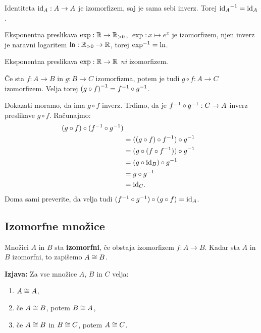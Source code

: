 \begin{primer}
  Identiteta $\id[A] : A \to A$ je izomorfizem, saj je sama sebi inverz.
  Torej $\inv{\id[A]} = \id[A]$.
\end{primer}

\begin{primer}
  Eksponentna preslikava $\exp : \RR \to \RR_{> 0}$, $\exp : x \mapsto e^x$ je
  izomorfizem, njen inverz je naravni logaritem $\ln : \RR_{> 0} \to \RR$, torej $\inv{\exp} = \ln$.
\end{primer}

\begin{primer}
  Eksponentna preslikava $\exp : \RR \to \RR$ \emph{ni} izomorfizem.
\end{primer}

\begin{izjava}
  Če sta $f : A \to B$ in $g : B \to C$ izomorfizma, potem je tudi $g \circ f : A \to C$ izomorfizem. Velja torej $\inv{(g \circ f)} = \inv{f} \circ \inv{g}$.
\end{izjava}

\begin{dokaz}
  Dokazati moramo, da ima $g \circ f$ inverz. Trdimo, da je $\inv{f} \circ \inv{g} : C \to A$ inverz preslikave $g \circ f$. Računajmo:
  \begin{align*}
    (g \circ f) \circ (\inv{f} \circ \inv{g}) \\
     &= ((g \circ f) \circ \inv{f}) \circ \inv{g} \\
     &= (g \circ (f \circ \inv{f})) \circ \inv{g} \\
     &= (g \circ \id[B]) \circ \inv{g} \\
     &= g \circ \inv{g} \\
     &= \id[C].
  \end{align*}
  Doma sami preverite, da velja tudi $(\inv{f} \circ \inv{g}) \circ (g \circ f) = \id[A]$.
\end{dokaz}

\subsection{Izomorfne množice}


\begin{definicija}
  Množici $A$ in $B$ sta \textbf{izomorfni}, če obstaja izomorfizem $f : A \to B$. Kadar sta $A$ in $B$ izomorfni, to zapišemo $A \iso B$.
\end{definicija}

\begin{izjava}
  \textbf{Izjava:} Za vse množice $A$, $B$ in $C$ velja:
  \begin{enumerate}
    \item $A \iso A$,
    \item če $A \iso B$, potem $B \iso A$,
    \item če $A \iso B$ in $B \iso C$, potem $A \iso C$.
  \end{enumerate}
\end{izjava}

